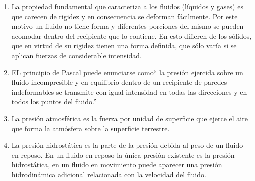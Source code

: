 \begin{enumerate}
    \item La propiedad fundamental que caracteriza a los fluidos (líquidos y gases) es que carecen de rigidez y en consecuencia se deforman fácilmente. Por este motivo un fluido no tiene forma y diferentes porciones del mismo se pueden acomodar dentro del recipiente que lo contiene. En esto
difieren de los sólidos, que en virtud de su rigidez tienen una forma definida, que sólo varía si se aplican fuerzas de considerable intensidad.
\item EL principio de Pascal puede enunciarse como`` la presión ejercida sobre un fluido incompresible y en equilibrio dentro de un recipiente de paredes indeformables se transmite con igual intensidad en todas las direcciones y en todos los puntos del fluido.''
\item La presión atmosférica es la fuerza por unidad de superficie que ejerce el aire que forma la atmósfera sobre la superficie terrestre.
\item La presión hidrostática es la parte de la presión debida al peso de un fluido en reposo. En un fluido en reposo la única presión existente es la presión hidrostática, en un fluido en movimiento puede aparecer una presión hidrodinámica adicional relacionada con la velocidad del fluido. 
\end{enumerate}













